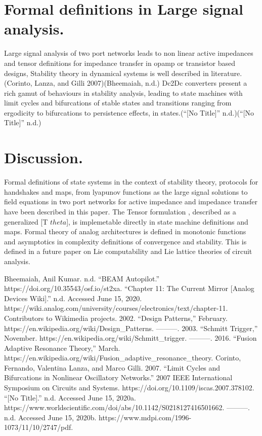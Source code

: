 \documentclass[conference]{IEEEtran}
\begin{document}
\section {Formal definitions in Large signal
analysis.}
Large signal analysis of two port networks
leads to non linear active impedances and
tensor definitions for impedance transfer in
opamp or transistor based designs, Stability
theory in dynamical systems is well
described in literature.(Corinto, Lanza, and
Gilli 2007)(Bheemaiah, n.d.)
Dc2Dc converters present a rich gamut of
behaviours in stability analysis, leading to
state machines with limit cycles and
bifurcations of stable states and transitions
ranging from ergodicity to bifurcations to
persistence effects, in states.(“[No Title]”
n.d.)(“[No Title]” n.d.)



\section{Discussion.}
Formal definitions of state systems in the
context of stability theory, protocols for
handshakes and maps, from lyapunov
functions as the large signal solutions to
field equations in two port networks for
active impedance and impedance transfer
have been described in this paper.
The Tensor formulation , described as a
generalized [T \(theta\)], is implemetable directly in
state machine definitions and maps. Formal
theory of analog architectures is defined in
monotonic functions and asymptotics in
complexity definitions of convergence and
stability. This is defined in a future paper on
Lie computability and Lie lattice theories of
circuit analysis.









\begin{thebibliography}{00}
Bheemaiah, Anil Kumar. n.d. “BEAM Autopilot.” https://doi.org/10.35543/osf.io/st2xa.
“Chapter 11: The Current Mirror [Analog Devices Wiki].” n.d. Accessed June 15, 2020. https://wiki.analog.com/university/courses/electronics/text/chapter-11.
Contributors to Wikimedia projects. 2002. “Design Patterns,” February. https://en.wikipedia.org/wiki/Design_Patterns.
———. 2003. “Schmitt Trigger,” November. https://en.wikipedia.org/wiki/Schmitt_trigger.
———. 2016. “Fusion Adaptive Resonance Theory,” March. 	https://en.wikipedia.org/wiki/Fusion_adaptive_resonance_theory.
Corinto, Fernando, Valentina Lanza, and Marco Gilli. 2007. “Limit Cycles and Bifurcations in Nonlinear Oscillatory Networks.” 2007 IEEE International Symposium on Circuits and Systems. https://doi.org/10.1109/iscas.2007.378102.
“[No Title].” n.d. Accessed June 15, 2020a. https://www.worldscientific.com/doi/abs/10.1142/S0218127416501662.
———. n.d. Accessed June 15, 2020b. https://www.mdpi.com/1996-1073/11/10/2747/pdf.
\end{thebibliography}
\end{document}
